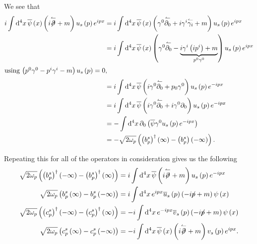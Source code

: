 
We see that
\begin{align}
    i \int \dd{^{4}x} \overline{\psi}\left( x \right) \left( i \overset{\leftharpoonup}{\fbs{\partial}} + m \right) u_s \left( p \right) e^{ipx} &=  i \int \dd{^{4}x} \overline{\psi}\left( x \right) \left(  \gamma^{0}\overset{\leftharpoonup}{\partial_0} + i \gamma^{i} \overset{\leftharpoonup}{\gamma_i} + m  \right) u_s \left( p \right) e^{ipx}    \\
&=  i \int \dd{^{4}x} \overline{\psi}\left( x \right) \left(  \gamma^{0}\overset{\leftharpoonup}{\partial_0} - \underbrace{i \gamma^{i} \left( ip^{i} \right)  + m}_{p^{0}\gamma^{0}}  \right) u_s \left( p \right) e^{ipx}    \\
\intertext{using $\left( p^{0}\gamma^{0} - p^{i}\gamma^{i} - m \right) u_s \left( p \right) = 0 $,}
&= i \int \dd{^{4}x} \overline{\psi} \left( i \gamma^{0} \overset{\leftharpoonup}{\partial_0} + p_0 \gamma^{0} \right) u_s \left( p \right) e^{-ipx} \\
&= i \int \dd{^{4}x} \overline{\psi} \left( i \gamma^{0} \overset{\leftharpoonup}{\partial_0} + i \gamma^{0} \partial_0 \right) u_s \left( p \right) e^{-ipx} \\
&= - \int \dd{^{4}x} \partial_0 \left( \overline{\psi} \gamma^{0} u_s \left( p \right) e^{-i p x} \right)  \\
&= - \sqrt{2 \omega_p}  \left( \left( b_p^{s} \right)^{\dag} \left( \infty \right)   - \left( b_{p}^{s} \right) \left( -\infty \right)   \right)
.\end{align}

Repeating this for all of the operators in consideration gives us the following
\begin{align}
    \sqrt{2\omega_p}  \left( \left( b^{s}_p \right)^{\dag}  \left( -\infty \right) - \left( b_p^{s} \right)^{\dag} \left( \infty \right) \right) &= i \int \dd{^{4}x} \overline{\psi} \left( i \overset{\leftharpoonup}{\fbs{\partial}} + m \right) u_s \left( p \right) e^{-ipx} \\
    \sqrt{2\omega_p}  \left( b_p^{s}\left( \infty \right) - b_p^{s}\left( -\infty \right)  \right) &= i \int \dd{^{4}x} e^{ipx} \overline{u}_s \left( p \right) \left( -i \fbs{p} + m \right) \psi \left( x \right) \\
    \sqrt{2\omega_p}  \left( \left( c^{s}_p \right)^{\dag}  \left( -\infty \right) - \left( c_p^{s} \right)^{\dag} \left( \infty \right) \right) &= -i \int \dd{^{4}x} e^{-ipx} \overline{v}_s\left( p \right) \left( -i \fbs{p} + m \right) \psi \left( x \right) \\
    \sqrt{2\omega_p}  \left( c^{s}_p \left( \infty \right) - c_p^{s}\left( -\infty \right)  \right) &= -i \int \dd{^{4}x} \overline{\psi}\left( x \right) \left( i \overset{\leftharpoonup}{\fbs{\partial}} + m \right) v_s \left( p \right) e^{ipx}
.\end{align}

